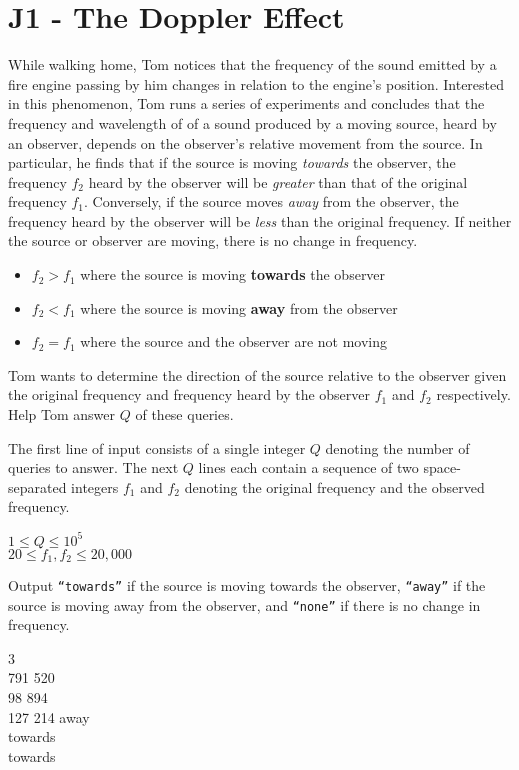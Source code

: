 \section*{J1 - The Doppler Effect}
While walking home, Tom notices that the frequency of the sound emitted by a fire engine passing by him changes in relation to the engine's position. Interested in this phenomenon, Tom runs a series of experiments and concludes that the frequency and wavelength of of a sound produced by a moving source, heard by an observer, depends on the observer's relative movement from the source. In particular, he finds that if the source is moving \textit{towards} the observer, the frequency $f_2$ heard by the observer will be \textit{greater} than that of the original frequency $f_1$. Conversely, if the source moves \textit{away} from the observer, the frequency heard by the observer will be \textit{less} than the original frequency. If neither the source or observer are moving, there is no change in frequency.

\begin{itemize}
    \item $f_2 > f_1$ where the source is moving \textbf{towards} the observer
    \item $f_2 < f_1$ where the source is moving \textbf{away} from the observer
    \item $f_2 = f_1$ where the source and the observer are not moving
\end{itemize}

Tom wants to determine the direction of the source relative to the observer given the original frequency and frequency heard by the observer $f_1$ and $f_2$ respectively. Help Tom answer $Q$ of these queries.

The first line of input consists of a single integer $Q$ denoting the number of queries to answer. The next $Q$ lines each contain a sequence of two space-separated integers $f_1$ and $f_2$ denoting the original frequency and the observed frequency.

\constraints
$1 \leq Q \leq 10^5$ \\
$20 \leq f_1, f_2 \leq 20,000$

\outputformat
Output  \texttt{``towards''} if the source is moving towards the observer, \texttt{``away''} if the source is moving away from the observer, and \texttt{``none''} if there is no change in frequency.

\newpage

\addsample
{
    3 \\
    791 520 \\
    98 894 \\
    127 214
}
{
    away \\
    towards \\
    towards
}